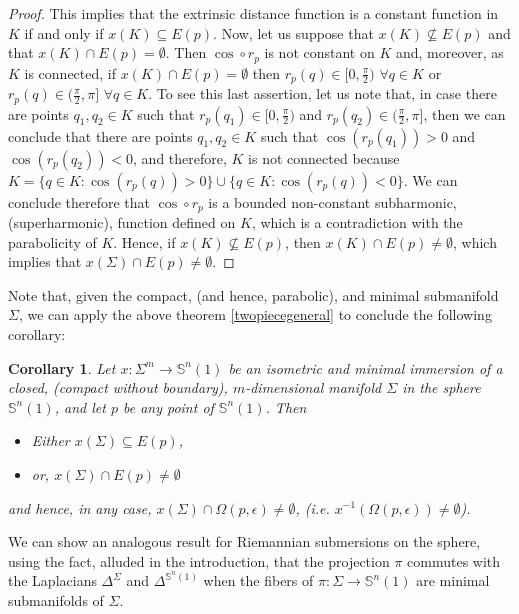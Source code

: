 \documentclass{amsart}
\newtheorem{corollary}[theorem]{Corollary}
\theoremstyle{definition}
\theoremstyle{remark}
\newcommand{\ese}{\mathbb{S}}
\begin{document}
\begin{proof}
This implies that the extrinsic distance function is a constant function in $K$ if and only if $x(K)\subseteq E(p)$.
Now,  let us suppose that $x(K) \not\subseteq E(p)$ and that $x(K)\cap  E(p)=\emptyset$. Then $\cos\circ r_p$ is not constant on $K$ and, moreover, as $K$ is connected,  if $x(K)\cap  E(p)=\emptyset$ then $r_p(q) \in [0,\frac{\pi}{2})\,\,\forall q \in K$ or $r_p(q) \in (\frac{\pi}{2},\pi]\,\,\forall q \in K$. To see this last assertion, let us note that, in case there are points $q_1, q_2 \in K$ such that $r_p(q_1) \in [0,\frac{\pi}{2})$ and  $r_p(q_2) \in (\frac{\pi}{2},\pi]$, then we can conclude that there are points $q_1, q_2 \in K$ such that $\cos(r_p(q_1)) >0$ and  $\cos (r_p(q_2)) <0$, and therefore, $K$ is not connected because $K=\{ q \in K: \cos(r_p(q)) >0\}\cup \{ q \in K: \cos(r_p(q))< 0\} $. We can conclude therefore that $\cos\circ r_p$ is a bounded non-constant subharmonic, (superharmonic), function defined on $K$, which is a contradiction with the parabolicity of $K$. Hence, if  $x(K) \not\subseteq E(p)$, then $x(K)\cap  E(p)\neq \emptyset$, which implies that $x(\Sigma)\cap  E(p)\neq \emptyset$.\end{proof}
Note that, given the compact, (and hence, parabolic), and minimal submanifold $\Sigma$, we can apply  the above theorem \ref{twopiecegeneral} to conclude the following corollary:
\begin{corollary}\label{cortwo}
	Let  $x: \Sigma^m \to \mathbb{S}^n(1)$ be an isometric and minimal immersion of a closed, (compact without boundary), $m$-dimensional manifold $\Sigma$ in the sphere  $\mathbb{S}^n(1)$, and let $p$ be any point of $\mathbb{S}^n(1)$.  Then
    \begin{itemize}
        \item Either $x(\Sigma)\subseteq E(p)$, 
        \item or, $x(\Sigma)\cap E(p)\neq \emptyset$
            \end{itemize}
            and  hence, in any case,  $x(\Sigma) \cap \Omega(p,\epsilon) \neq \emptyset$, (i.e. $x^{-1}(\Omega(p,\epsilon))\neq \emptyset$).
\end{corollary}

We can show an analogous result for Riemannian submersions on the sphere, using the fact, alluded in the introduction, that the projection $\pi$ commutes with the Laplacians $\Delta^\Sigma$ and $\Delta^{\ese^n(1)}$ when the fibers of $\pi: \Sigma \rightarrow \ese^n(1)$ are minimal submanifolds of $\Sigma$.
\end{document}
